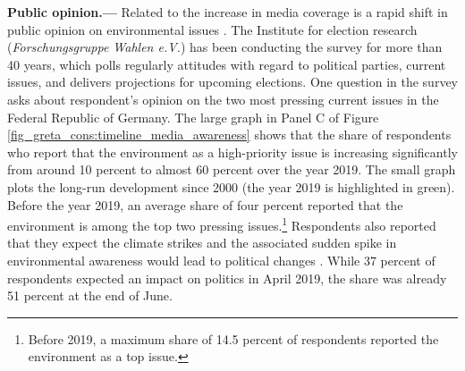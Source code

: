 \textbf{Public opinion.---} Related to the increase in media coverage is a rapid shift in public opinion on environmental issues \citep{smith2019window}. The Institute for election research (\textit{Forschungsgruppe Wahlen e.V.}) has been conducting the survey \cite{politbarometer2019} for more than 40 years, which polls regularly attitudes with regard to political parties, current issues, and delivers projections for upcoming elections. One question in the survey asks about respondent's opinion on the two most pressing current issues in the Federal Republic of Germany. The large graph in Panel C of Figure \ref{fig_greta_cons:timeline_media_awareness} shows that the share of respondents who report that the environment as a high-priority issue is increasing significantly from around 10 percent to almost 60 percent over the year 2019. The small graph plots the long-run development since 2000 (the year 2019 is highlighted in green). Before the year 2019, an average share of four percent reported that the environment is among the top two pressing issues.\footnote{Before 2019, a maximum share of 14.5 percent of respondents reported the environment as a top issue.} Respondents also reported that they expect the climate strikes and the associated sudden spike in environmental awareness would lead to political changes \citep{ForschungsgruppeWahlen2019FFF}. While 37 percent of respondents expected an impact on politics in April 2019, the share was already 51 percent at the end of June.




 




















\newpage





